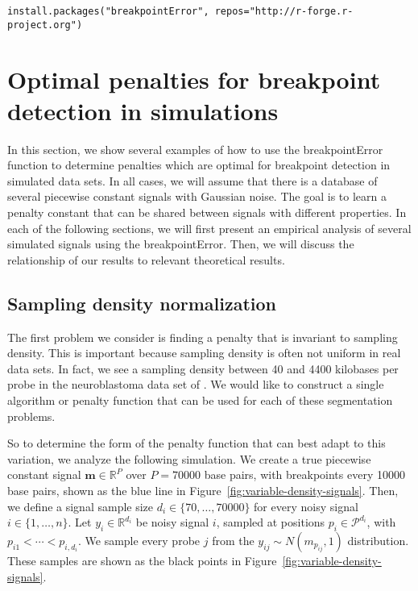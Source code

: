 \documentclass{jsfds} %
\newcommand{\RR}{\mathbb{R}}
\begin{document}
\begin{verbatim}
install.packages("breakpointError", repos="http://r-forge.r-project.org")
\end{verbatim}


\newpage

\section{Optimal penalties for breakpoint detection in simulations}
\label{sec:simulations}
In this section, we show several examples of how to use the
breakpointError function to determine penalties which are optimal for
breakpoint detection in simulated data sets. In all cases, we will
assume that there is a database of several piecewise constant signals
with Gaussian noise. The goal is to learn a penalty constant that can
be shared between signals with different properties. In each of the
following sections, we will first present an empirical analysis of
several simulated signals using the breakpointError. Then, we will
discuss the relationship of our results to relevant theoretical
results.

\subsection{Sampling density normalization}
\label{variable_density}
The first problem we consider is finding a penalty that is invariant
to sampling density. This is important because sampling density is
often not uniform in real data sets. In fact, we see a sampling
density between 40 and 4400 kilobases per probe in the neuroblastoma
data set of \citet{HOCKING-breakpoints}. We would like to construct a
single algorithm or penalty function that can be used for each of
these segmentation problems.

So to determine the form of the penalty function that can best adapt
to this variation, we analyze the following simulation. We create a
true piecewise constant signal $\mathbf m\in\RR^P$ over $P=70000$ base
pairs, with breakpoints every 10000 base pairs, shown as the blue line
in Figure~\ref{fig:variable-density-signals}. Then, we define a signal
sample size $d_i\in\{70,\dots,70000\}$ for every noisy signal
$i\in\{1,\dots,n\}$. Let $y_i\in\RR^{d_i}$ be noisy signal $i$,
sampled at positions $p_i\in\mathcal P^{d_i}$, with
$p_{i1}<\cdots<p_{i,d_i}$. We sample every probe $j$ from the
$y_{ij}\sim N(m_{p_{ij}},1)$ distribution. These samples are shown as
the black points in Figure~\ref{fig:variable-density-signals}.
\end{document}
